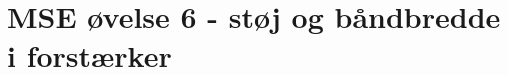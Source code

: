 \documentclass[a4paper, 11pt, articel,oneside,openany]{memoir} %
\begin{document}
	
\chapter*{MSE øvelse 6 - støj og båndbredde i forstærker}
\end{document}
